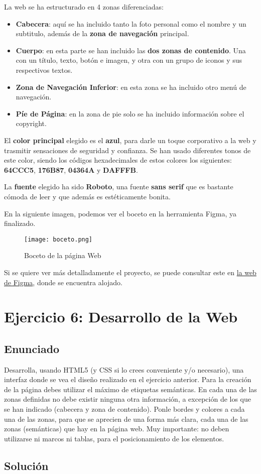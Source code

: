 La web se ha estructurado en 4 zonas diferenciadas:

\begin{itemize}
    \item \textbf{Cabecera}: aquí se ha incluido tanto la foto personal como el nombre y un subtitulo, además de la \textbf{zona de navegación} principal.
    \item \textbf{Cuerpo}: en esta parte se han incluido las \textbf{dos zonas de contenido}. Una con un título, texto, botón e imagen, y otra con un grupo de iconos y sus respectivos textos.
    \item \textbf{Zona de Navegación Inferior}: en esta zona se ha incluido otro menú de navegación.
    \item \textbf{Píe de Página}: en la zona de pie solo se ha incluido información sobre el copyright.
\end{itemize}

El \textbf{color principal} elegido es el \textbf{azul}, para darle un toque corporativo a la web y trasmitir sensaciones de seguridad y confianza. Se han usado diferentes tonos de este color, siendo los códigos hexadecimales de estos colores los siguientes: \textbf{64CCC5}, \textbf{176B87}, \textbf{04364A}  y \textbf{DAFFFB}.

La \textbf{fuente} elegido ha sido \textbf{Roboto}, una fuente \textbf{sans serif} que es bastante cómoda de leer y que además es estéticamente bonita.

En la siguiente imagen, podemos ver el boceto en la herramienta Figma, ya finalizado.

\begin{figure}[H]
    \centering
    \texttt{[image: boceto.png]}
    \caption{Boceto de la página Web}
\end{figure}

Si se quiere ver más detalladamente el proyecto, se puede consultar este en \href{https://www.figma.com/file/mUFhA9wFqySA6ou8wb1zEW/Desarrollo-Interfaces-Web?type=design&node-id=0%3A1&mode=design&t=Z6PpXOA2wEXOfK2i-1}{la web de Figma}, donde se encuentra alojado.

\section{Ejercicio 6: Desarrollo de la Web}
\subsection{Enunciado}
Desarrolla, usando HTML5 (y CSS si lo crees conveniente y/o necesario), una interfaz donde se vea el diseño realizado en el ejercicio anterior. Para la creación de la página debes utilizar el máximo de etiquetas semánticas. En cada una de las zonas definidas no debe existir ninguna otra información, a excepción de los que se han indicado (cabecera y zona de contenido). Ponle bordes y colores a cada una de las zonas, para que se aprecien de una forma más clara, cada una de las zonas (semánticas) que hay en la página web. Muy importante: no deben utilizarse ni marcos ni tablas, para el posicionamiento de los elementos.

\subsection{Solución}



%
%

